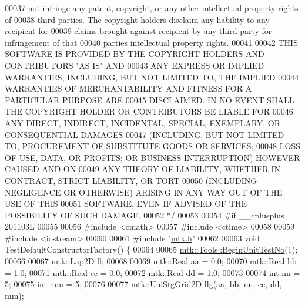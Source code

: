\begin{DoxyCode}
00037 \textcolor{comment}{not infringe any patent, copyright, or any other intellectual property rights of}
00038 \textcolor{comment}{third parties. The copyright holders disclaim any liability to any recipient for}
00039 \textcolor{comment}{claims brought against recipient by any third party for infringement of that}
00040 \textcolor{comment}{parties intellectual property rights.}
00041 \textcolor{comment}{}
00042 \textcolor{comment}{THIS SOFTWARE IS PROVIDED BY THE COPYRIGHT HOLDERS AND CONTRIBUTORS "AS IS" AND}
00043 \textcolor{comment}{ANY EXPRESS OR IMPLIED WARRANTIES, INCLUDING, BUT NOT LIMITED TO, THE IMPLIED}
00044 \textcolor{comment}{WARRANTIES OF MERCHANTABILITY AND FITNESS FOR A PARTICULAR PURPOSE ARE}
00045 \textcolor{comment}{DISCLAIMED. IN NO EVENT SHALL THE COPYRIGHT HOLDER OR CONTRIBUTORS BE LIABLE FOR}
00046 \textcolor{comment}{ANY DIRECT, INDIRECT, INCIDENTAL, SPECIAL, EXEMPLARY, OR CONSEQUENTIAL DAMAGES}
00047 \textcolor{comment}{(INCLUDING, BUT NOT LIMITED TO, PROCUREMENT OF SUBSTITUTE GOODS OR SERVICES;}
00048 \textcolor{comment}{LOSS OF USE, DATA, OR PROFITS; OR BUSINESS INTERRUPTION) HOWEVER CAUSED AND ON}
00049 \textcolor{comment}{ANY THEORY OF LIABILITY, WHETHER IN CONTRACT, STRICT LIABILITY, OR TORT}
00050 \textcolor{comment}{(INCLUDING NEGLIGENCE OR OTHERWISE) ARISING IN ANY WAY OUT OF THE USE OF THIS}
00051 \textcolor{comment}{SOFTWARE, EVEN IF ADVISED OF THE POSSIBILITY OF SUCH DAMAGE.}
00052 \textcolor{comment}{*/}
00053 
00054 \textcolor{preprocessor}{#if \_\_cplusplus == 201103L}
00055 
00056 \textcolor{preprocessor}{#include <cmath>}
00057 \textcolor{preprocessor}{#include <ctime>}
00058 
00059 \textcolor{preprocessor}{#include <iostream>}
00060 
00061 \textcolor{preprocessor}{#include "\hyperlink{mtk_8h}{mtk.h}"}
00062 
00063 \textcolor{keywordtype}{void} TestDefaultConstructorFactory() \{
00064 
00065   \hyperlink{classmtk_1_1Tools_a26ee906d28523378522a75e25c3a4e19}{mtk::Tools::BeginUnitTestNo}(1);
00066 
00067   \hyperlink{classmtk_1_1Lap2D}{mtk::Lap2D} ll;
00068 
00069   \hyperlink{group__c01-roots_gac080bbbf5cbb5502c9f00405f894857d}{mtk::Real} aa = 0.0;
00070   \hyperlink{group__c01-roots_gac080bbbf5cbb5502c9f00405f894857d}{mtk::Real} bb = 1.0;
00071   \hyperlink{group__c01-roots_gac080bbbf5cbb5502c9f00405f894857d}{mtk::Real} cc = 0.0;
00072   \hyperlink{group__c01-roots_gac080bbbf5cbb5502c9f00405f894857d}{mtk::Real} dd = 1.0;
00073 
00074   \textcolor{keywordtype}{int} nn = 5;
00075   \textcolor{keywordtype}{int} mm = 5;
00076 
00077   \hyperlink{classmtk_1_1UniStgGrid2D}{mtk::UniStgGrid2D} llg(aa, bb, nn, cc, dd, mm);

\end{DoxyCode}
